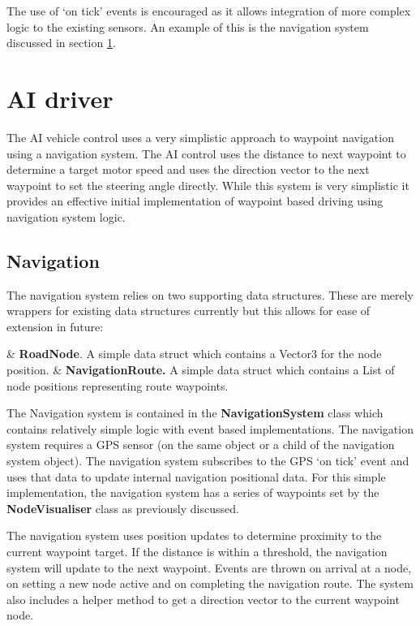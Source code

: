 \documentclass{article}
\begin{document}
The use of `on tick' events is encouraged as it allows integration of more complex logic to the existing sensors. An example of this is the navigation system discussed in section \ref{s:AI}.

\section{AI driver}\label{s:AI}

The AI vehicle control uses a very simplistic approach to waypoint navigation using a navigation system. The AI control uses the distance to next waypoint to determine a target motor speed and uses the direction vector to the next waypoint to set the steering angle directly. While this system is very simplistic it provides an effective initial implementation of waypoint based driving using navigation system logic.

\subsection{Navigation}

The navigation system relies on two supporting data structures. These are merely wrappers for existing data structures currently but this allows for ease of extension in future: 
\begin{easylist}
	& \textbf{RoadNode}. A simple data struct which contains a Vector3 for the node position.
	& \textbf{NavigationRoute.}  A simple data struct which contains a List of node positions representing route waypoints.
\end{easylist}

The Navigation system is contained in the \textbf{NavigationSystem} class which contains relatively simple logic with event based implementations. The navigation system requires a GPS sensor (on the same object or a child of the navigation system object). The navigation system subscribes to the GPS `on tick' event and uses that data to update internal navigation positional data. For this simple implementation, the navigation system has a series of waypoints set by the \textbf{NodeVisualiser} class as previously discussed.

The navigation system uses position updates to determine proximity to the current waypoint target. If the distance is within a threshold, the navigation system will update to the next waypoint. Events are thrown on arrival at a node, on setting a new node active and on completing the navigation route. The system also includes a helper method to get a direction vector to the current waypoint node.
\end{document}
